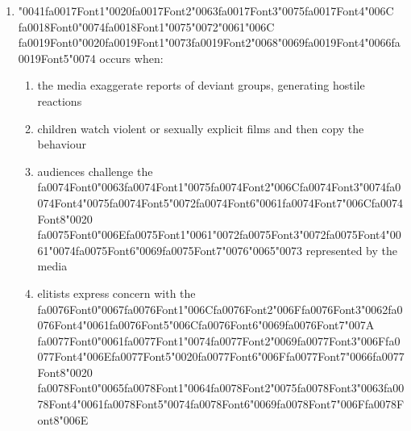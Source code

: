 \documentclass[12pt]{article}
\begin{document}
\begin{enumerate}[label=\arabic*.]
\begin{enumerate}[label=(\alph*)]
    \item audiences passively absorb whatever messages they are given
    \item social interaction reinforces the ideas and images that audiences select
\end{enumerate}
\item {\char"0041}{\csname fa0017Font1\endcsname\char"0020}{\csname fa0017Font2\endcsname\char"0063}{\csname fa0017Font3\endcsname\char"0075}{\csname fa0017Font4\endcsname\char"006C} {\csname fa0018Font0\endcsname\char"0074}{\csname fa0018Font1\endcsname\char"0075}{\char"0072}{\char"0061}{\char"006C} {\csname fa0019Font0\endcsname\char"0020}{\csname fa0019Font1\endcsname\char"0073}{\csname fa0019Font2\endcsname\char"0068}{\char"0069}{\csname fa0019Font4\endcsname\char"0066}{\csname fa0019Font5\endcsname\char"0074} occurs when:
\begin{enumerate}[label=(\alph*)]
    \item the media exaggerate reports of deviant groups, generating hostile reactions
    \item children watch violent or sexually explicit films and then copy the behaviour
    \item audiences challenge the {\csname fa0074Font0\endcsname\char"0063}{\csname fa0074Font1\endcsname\char"0075}{\csname fa0074Font2\endcsname\char"006C}{\csname fa0074Font3\endcsname\char"0074}{\csname fa0074Font4\endcsname\char"0075}{\csname fa0074Font5\endcsname\char"0072}{\csname fa0074Font6\endcsname\char"0061}{\csname fa0074Font7\endcsname\char"006C}{\csname fa0074Font8\endcsname\char"0020} {\csname fa0075Font0\endcsname\char"006E}{\csname fa0075Font1\endcsname\char"0061}{\char"0072}{\csname fa0075Font3\endcsname\char"0072}{\csname fa0075Font4\endcsname\char"0061}{\char"0074}{\csname fa0075Font6\endcsname\char"0069}{\csname fa0075Font7\endcsname\char"0076}{\char"0065}{\char"0073} represented by the media
    \item elitists express concern with the {\csname fa0076Font0\endcsname\char"0067}{\csname fa0076Font1\endcsname\char"006C}{\csname fa0076Font2\endcsname\char"006F}{\csname fa0076Font3\endcsname\char"0062}{\csname fa0076Font4\endcsname\char"0061}{\csname fa0076Font5\endcsname\char"006C}{\csname fa0076Font6\endcsname\char"0069}{\csname fa0076Font7\endcsname\char"007A} {\csname fa0077Font0\endcsname\char"0061}{\csname fa0077Font1\endcsname\char"0074}{\csname fa0077Font2\endcsname\char"0069}{\csname fa0077Font3\endcsname\char"006F}{\csname fa0077Font4\endcsname\char"006E}{\csname fa0077Font5\endcsname\char"0020}{\csname fa0077Font6\endcsname\char"006F}{\csname fa0077Font7\endcsname\char"0066}{\csname fa0077Font8\endcsname\char"0020} {\csname fa0078Font0\endcsname\char"0065}{\csname fa0078Font1\endcsname\char"0064}{\csname fa0078Font2\endcsname\char"0075}{\csname fa0078Font3\endcsname\char"0063}{\csname fa0078Font4\endcsname\char"0061}{\csname fa0078Font5\endcsname\char"0074}{\csname fa0078Font6\endcsname\char"0069}{\csname fa0078Font7\endcsname\char"006F}{\csname fa0078Font8\endcsname\char"006E}

\end{enumerate}
\end{enumerate}
\end{document}
